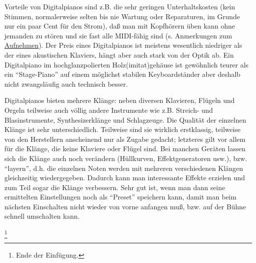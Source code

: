 Vorteile von Digitalpianos sind z.B. die sehr geringen Unterhaltskosten (kein Stimmen, normalerweise selten bis nie Wartung oder Reparaturen, im Grunde nur ein paar Cent für den Strom), daß man mit Kopfhörern üben kann ohne jemanden zu stören und sie fast alle MIDI-fähig sind (s. Anmerkungen zum \hyperref[c1iii13MIDI]{Aufnehmen}).
Der Preis eines Digitalpianos ist meistens wesentlich niedriger als der eines akustischen Klaviers, hängt aber auch stark von der Optik ab.
Ein Digitalpiano im hochglanzpolierten Holz(imitat)gehäuse ist gewöhnlich teurer als ein \enquote{Stage-Piano} auf einem möglichst stabilen Keyboardständer aber deshalb nicht zwangsläufig auch technisch besser.

Digitalpianos bieten mehrere Klänge: neben diversen Klavieren, Flügeln und Orgeln teilweise auch völlig andere Instrumente wie z.B. Streich- und Blasinstrumente, Synthesizerklänge und Schlagzeuge.
Die Qualität der einzelnen Klänge ist sehr unterschiedlich.
Teilweise sind sie wirklich erstklassig, teilweise von den Herstellern anscheinend nur als Zugabe gedacht; letzteres gilt vor allem für die Klänge, die keine Klaviere oder Flügel sind.
Bei manchen Geräten lassen sich die Klänge auch noch verändern (Hüllkurven, Effektgeneratoren usw.), bzw. \enquote{layern}, d.h. die einzelnen Noten werden mit mehreren verschiedenen Klängen gleichzeitig wiedergegeben.
Dadurch kann man interessante Effekte erzielen und zum Teil sogar die Klänge verbessern.
Sehr gut ist, wenn man dann seine ermittelten Einstellungen noch als \enquote{Preset} speichern kann, damit man beim nächsten Einschalten nicht wieder von vorne anfangen muß, bzw. auf der Bühne schnell umschalten kann.


\footnote{Ende der Einfügung.}



